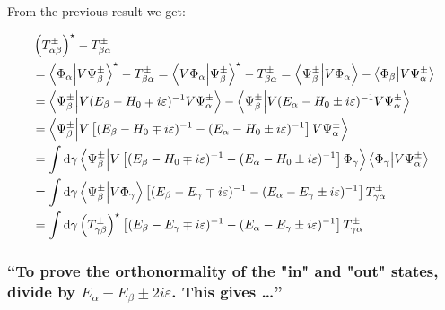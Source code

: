 \subsubsection{ }
From the previous result we get:
\begin{widetext}
	\begin{align*}
		&\left(T_{\alpha\beta}^\pm\right)^\star-T_{\beta\alpha}^\pm\\
		&=\innerproduct{\Phi_\alpha}{V\Psi_\beta^\pm}^\star-T_{\beta\alpha}^\pm
		=\innerproduct{V\Phi_\alpha}{\Psi_\beta^\pm}^\star-T_{\beta\alpha}^\pm
		=\innerproduct{\Psi_\beta^\pm}{V\Phi_\alpha}-\innerproduct{\Phi_\beta}{V\Psi_\alpha^\pm}\\
		&=\innerproduct{\Psi_\beta^\pm}{V(E_\beta-H_0\mp i \varepsilon)^{-1}V\Psi_\alpha^\pm}
		-\innerproduct{\Psi_\beta^\pm}{V(E_\alpha-H_0\pm i \varepsilon)^{-1}V\Psi_\alpha^\pm}\\
		&=\innerproduct{\Psi_\beta^\pm}{V\left[(E_\beta-H_0\mp i \varepsilon)^{-1}-(E_\alpha-H_0\pm i \varepsilon)^{-1}\right]V\Psi_\alpha^\pm}\\
		&=\int\dd{\gamma}\innerproduct{\Psi_\beta^\pm}{V\left[(E_\beta-H_0\mp i \varepsilon)^{-1}-(E_\alpha-H_0\pm i \varepsilon)^{-1}\right]\Phi_\gamma}
		\innerproduct{\Phi_\gamma}{V\Psi_\alpha^\pm}\\
		&=\int\dd{\gamma}\innerproduct{\Psi_\beta^\pm}{V\Phi_\gamma}\left[(E_\beta-E_\gamma\mp i \varepsilon)^{-1}-(E_\alpha-E_\gamma\pm i \varepsilon)^{-1}\right]
		T_{\gamma\alpha}^\pm\\
		&=\int\dd{\gamma}\left(T_{\gamma\beta}^\pm\right)^\star\left[(E_\beta-E_\gamma\mp i \varepsilon)^{-1}-(E_\alpha-E_\gamma\pm i \varepsilon)^{-1}\right]
		T_{\gamma\alpha}^\pm
	\end{align*}


	\subsubsection{\enquote{To prove the orthonormality of the "in" and "out" states, divide  by $E_\alpha-E_\beta\pm 2i\varepsilon$. This gives \dots} }
	
	\label{sususec:3_2_p116_1}
	

\end{widetext}
